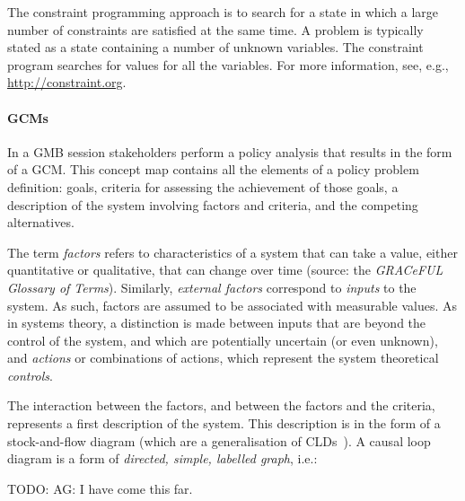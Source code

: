 The constraint programming approach is to search for a state in which a large
number of constraints are satisfied at the same time. A problem is typically
stated as a state containing a number of unknown variables. The constraint
program searches for values for all the variables. For more information, see,
e.g., \url{http://constraint.org}.

\paragraph{\acfp{GCM}}




In a \acl{GMB} session stakeholders perform a policy analysis that results
in the form of a \acl{GCM}. This concept map contains all the elements of a
policy problem definition: goals, criteria for assessing the achievement of
those goals, a description of the system involving factors and criteria, and the
competing alternatives. 

The term \emph{factors} refers to characteristics of a system that can take a
value, either quantitative or qualitative, that can change over time (source:
the \emph{GRACeFUL Glossary of Terms}). Similarly, \emph{external factors}
correspond to \emph{inputs} to the system. As such, factors are assumed to be
associated with measurable values. As in systems theory, a distinction is made
between inputs that are beyond the control of the system, and which are
potentially uncertain (or even unknown), and \emph{actions} or combinations of
actions, which represent the system theoretical \emph{controls}.

The interaction between the factors, and between the factors and the
criteria, represents a first description of the system. This
description is in the form of a stock-and-flow diagram (which are a generalisation
of \aclp{CLD}~\cite{burns}). A causal
loop diagram is a form of \emph{directed, simple, labelled graph}, i.e.:

TODO: AG: I have come this far.


